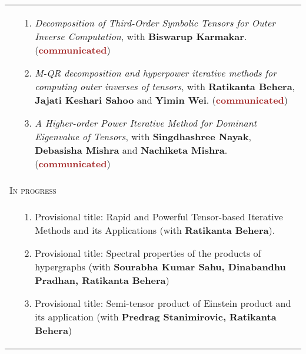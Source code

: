 \documentclass[a4paper,12pt]{article}
\begin{document}
\begin{longtable}{lp{15cm}}
& 
\vspace{-0.5cm}
\begin{enumerate}
\item {\it Decomposition of Third-Order Symbolic Tensors for Outer Inverse Computation}, with {\bf Biswarup Karmakar}. ({\bf \textcolor{brown}{communicated}})
\item {\it M-QR decomposition and hyperpower iterative methods for computing outer inverses of tensors}, with {\bf Ratikanta Behera}, {\bf Jajati Keshari Sahoo} and {\bf Yimin Wei}. ({\bf \textcolor{brown}{communicated}})
\item \emph{A Higher-order Power Iterative Method for Dominant Eigenvalue of Tensors}, with {\bf Singdhashree Nayak}, {\bf Debasisha Mishra} and {\bf Nachiketa Mishra}. ({\bf \textcolor{brown}{communicated}})
\end{enumerate}\\[1cm]
\multicolumn{2}{l}{\textsc{In progress}}\\[0.2cm]
& 
\vspace{-0.5cm}
\begin{enumerate}
\item Provisional title: Rapid and Powerful Tensor-based Iterative Methods and its Applications (with {\bf Ratikanta Behera}).
\item Provisional title: Spectral properties of the products of hypergraphs (with {\bf Sourabha Kumar Sahu, Dinabandhu Pradhan, Ratikanta Behera})
\item Provisional title: Semi-tensor product of Einstein product and its application (with {\bf Predrag Stanimirovic, Ratikanta Behera})
\end{enumerate}
\end{longtable}
\end{document}
